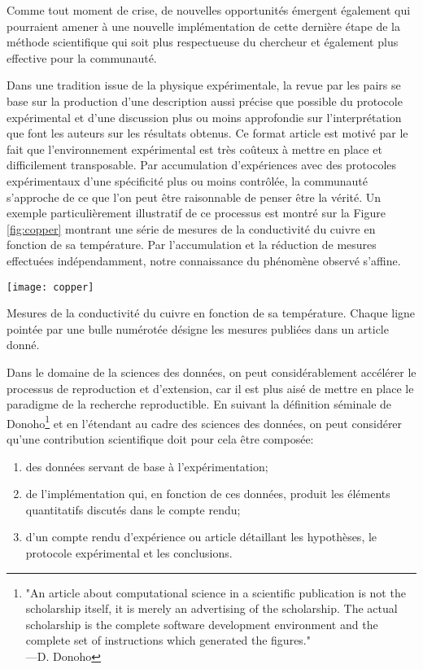 Comme tout moment de crise, de nouvelles opportunités émergent également qui pourraient amener à une nouvelle implémentation de cette dernière étape de la méthode scientifique qui soit plus respectueuse du chercheur et également plus effective pour la communauté. 

Dans une tradition issue de la physique expérimentale, la revue par les pairs se base sur la production d'une description aussi précise que possible du protocole expérimental et d'une discussion plus ou moins approfondie sur l'interprétation que font les auteurs sur les résultats obtenus. Ce format \og article \fg est motivé par le fait que l'environnement expérimental est très coûteux à mettre en place et difficilement transposable. Par accumulation d'expériences avec des protocoles expérimentaux d'une spécificité plus ou moins contrôlée, la communauté s'approche de ce que l'on peut être raisonnable de penser être la vérité. Un exemple particulièrement illustratif de ce processus est montré sur la Figure \ref{fig:copper} montrant une série de mesures de la conductivité du cuivre en fonction de sa température. Par l'accumulation et la réduction de mesures effectuées indépendamment, notre connaissance du phénomène observé s'affine.

\begin{marginfigure}
  \texttt{[image: copper]}
  \caption{Mesures de la conductivité du cuivre en fonction de sa température. Chaque ligne pointée par une bulle numérotée désigne les mesures publiées dans un article donné.}
  \label{fig:copper}
\end{marginfigure}

Dans le domaine de la sciences des données, on peut considérablement accélérer le processus de reproduction et d'extension, car il est plus aisé de mettre en place le paradigme de la recherche reproductible. En suivant la définition séminale de Donoho\footnote{"An article about computational science in a scientific publication is not the scholarship itself, it is merely an advertising of the scholarship. The actual scholarship is the complete software development environment and the complete set of instructions which generated the figures." \\—D. Donoho} et en l'étendant au cadre des sciences des données, on peut considérer qu'une contribution scientifique doit pour cela être composée:
\begin{enumerate}
  \item des données servant de base à l'expérimentation;
  \item de l'implémentation qui, en fonction de ces données, produit les éléments quantitatifs discutés dans le compte rendu;
  \item d'un compte rendu d'expérience ou article détaillant les hypothèses, le protocole expérimental et les conclusions.
\end{enumerate}

